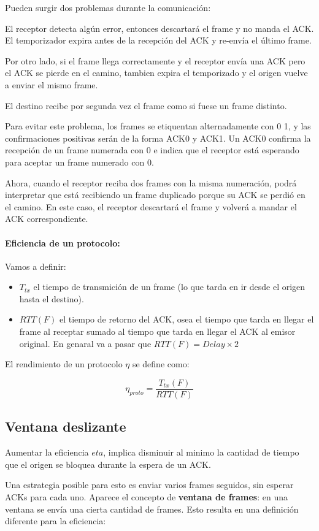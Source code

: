 Pueden surgir dos problemas durante la comunicación:
  
El receptor detecta algún error, entonces descartará el frame y no manda el ACK. El temporizador expira antes de la recepción del ACK y re-envía el último frame.

Por otro lado, si el frame llega correctamente y el receptor envía una ACK pero el ACK se pierde en el camino, tambien expira el temporizado y el origen vuelve a enviar el mismo frame. 
  
El destino recibe por segunda vez el frame como si fuese un frame distinto.

Para evitar este problema, los frames se etiquentan alternadamente con 0  1, y las confirmaciones positivas serán de la forma ACK0 y ACK1. Un ACK0 confirma la recepción de un frame numerada con 0 e indica que el receptor está esperando para aceptar un frame numerado con 0.

Ahora, cuando el receptor reciba dos frames con la misma numeración, podrá interpretar que está recibiendo un frame duplicado porque su ACK se perdió en el camino. En este caso, el receptor descartará el frame y volverá a mandar el ACK correspondiente.

\paragraph{Eficiencia de un protocolo:} 
Vamos a definir:
\begin{itemize}
  \item \(T_{tx}\) el tiempo de transmición de un frame (lo que tarda en ir desde el origen hasta el destino).
  \item \(RTT(F)\) el tiempo de retorno del ACK, osea el tiempo que tarda en llegar el frame al receptar sumado al tiempo que tarda en llegar el ACK al emisor original. En genaral va a pasar que \(RTT(F) = Delay\times 2\) 
\end{itemize}

El rendimiento de un protocolo \(\eta\) se define como:

\[\eta_{proto} = \frac{T_{tx}(F)}{RTT(F)}\]

\subsection{Ventana deslizante}
Aumentar la eficiencia \(eta\), implica disminuir al minimo la cantidad de tiempo que el origen se bloquea durante la espera de un ACK.

Una estrategia posible para esto es enviar varios frames seguidos, sin esperar ACKs para cada uno.
Aparece el concepto de \textbf{ventana de frames}: en una ventana se envía una cierta cantidad de frames. Esto resulta en una definición diferente para la eficiencia:

